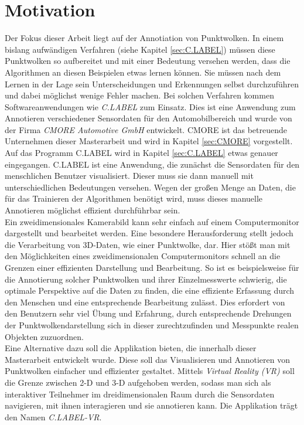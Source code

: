 \section{Motivation}
Der Fokus dieser Arbeit liegt auf der Annotiation von Punktwolken. In einem bislang aufwändigen Verfahren (siehe Kapitel \ref{sec:C.LABEL}) müssen diese Punktwolken so aufbereitet und mit einer Bedeutung versehen werden, dass die Algorithmen an diesen Beispielen etwas lernen können. Sie müssen nach dem Lernen in der Lage sein Unterscheidungen und Erkennungen selbst durchzuführen und dabei möglichst wenige Fehler machen. Bei solchen Verfahren kommen Softwareanwendungen wie \textit{C.LABEL} zum Einsatz. Dies ist eine Anwendung zum Annotieren verschiedener Sensordaten für den Automobilbereich und wurde von der Firma \textit{CMORE Automotive GmbH} entwickelt. CMORE ist das betreuende Unternehmen dieser Masterarbeit und wird in Kapitel \ref{sec:CMORE} vorgestellt. Auf das Programm C.LABEL wird in Kapitel \ref{sec:C.LABEL} etwas genauer eingegangen. C.LABEL ist eine Anwendung, die zunächst die Sensordaten für den menschlichen Benutzer visualisiert. Dieser muss sie dann manuell mit unterschiedlichen Bedeutungen versehen. Wegen der großen Menge an Daten, die für das Trainieren der Algorithmen benötigt wird, muss dieses manuelle Annotieren möglichst effizient durchführbar sein.\\

Ein zweidimensionales Kamerabild kann sehr einfach auf einem Computermonitor dargestellt und bearbeitet werden. Eine besondere Herausforderung stellt jedoch die Verarbeitung von 3D-Daten, wie einer Punktwolke, dar. Hier stößt man mit den Möglichkeiten eines zweidimensionalen Computermonitors schnell an die Grenzen einer effizienten Darstellung und Bearbeitung. So ist es beispielsweise für die Annotierung solcher Punktwolken und ihrer Einzelmesswerte schwierig, die optimale Perspektive auf die Daten zu finden, die eine effiziente Erfassung durch den Menschen und eine entsprechende Bearbeitung zulässt. Dies erfordert von den Benutzern sehr viel Übung und Erfahrung, durch entsprechende Drehungen der Punktwolkendarstellung sich in dieser zurechtzufinden und Messpunkte realen Objekten zuzuordnen.\\ 

Eine Alternative dazu soll die Applikation bieten, die innerhalb dieser Masterarbeit entwickelt wurde. Diese soll das Visualisieren und Annotieren von Punktwolken einfacher und effizienter gestaltet. Mittels \textit{Virtual Reality (VR)} soll die Grenze zwischen 2-D und 3-D aufgehoben werden, sodass man sich als interaktiver Teilnehmer im dreidimensionalen Raum durch die Sensordaten navigieren, mit ihnen interagieren und sie annotieren kann. Die Applikation trägt den Namen \textit{C.LABEL-VR}.\\

